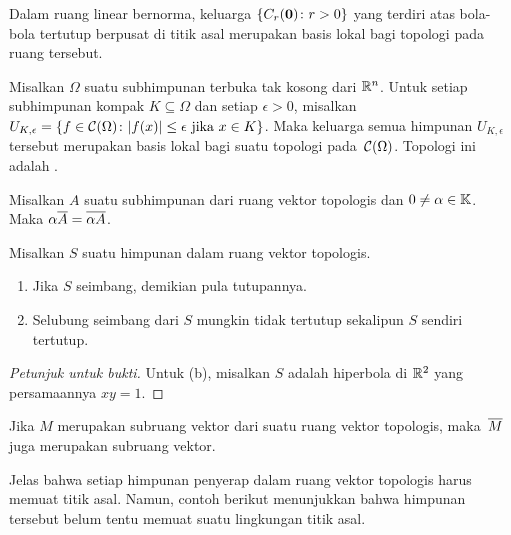 \begin{exam} Dalam ruang linear bernorma, keluarga $\{C_r(\mathbf{0})\colon r > 0\}$ yang terdiri atas bola-bola tertutup berpusat di titik asal merupakan basis lokal bagi
topologi pada ruang tersebut.
\end{exam}

\begin{exam} Misalkan $\Omega$ suatu subhimpunan terbuka tak kosong dari $\mathbb{R}^n$.  Untuk setiap subhimpunan kompak $K \subseteq \Omega$ dan setiap $\epsilon > 0$, misalkan
$U_{K,\epsilon} = \{ f \in \mathcal{C}(\Omega)\colon \lvert f(x)\rvert \le \epsilon \text{ jika } x \in K\}$.  Maka keluarga semua
himpunan $U_{K,\epsilon}$ tersebut merupakan basis lokal bagi suatu topologi pada~$\mathcal{C}(\Omega)$.  Topologi ini adalah
.
\end{exam}

\begin{prop} Misalkan $A$ suatu subhimpunan dari ruang vektor topologis dan $0 \ne \alpha \in \mathbb{K}$.  Maka $\alpha \overline{A} = \overline{\alpha A}$.
\end{prop}

\begin{prop} Misalkan $S$ suatu himpunan dalam ruang vektor topologis.
   \begin{enumerate}[label=\rm{(\alph*)}]
    \item Jika $S$ seimbang, demikian pula tutupannya.
    \item Selubung seimbang dari $S$ mungkin tidak tertutup sekalipun $S$ sendiri tertutup.
   \end{enumerate}
\end{prop}

\begin{proof}[\emph{Petunjuk untuk bukti}] Untuk (b), misalkan $S$ adalah hiperbola di $\mathbb{R}^2$ yang persamaannya $xy = 1$.  \ns
\end{proof}

\begin{prop} Jika $M$ merupakan subruang vektor dari suatu ruang vektor topologis, maka~$\overline{M}$ juga merupakan subruang vektor.
\end{prop}

Jelas bahwa setiap himpunan penyerap dalam ruang vektor topologis harus memuat titik asal.  Namun, contoh berikut menunjukkan bahwa
himpunan tersebut belum tentu memuat suatu lingkungan titik asal.

